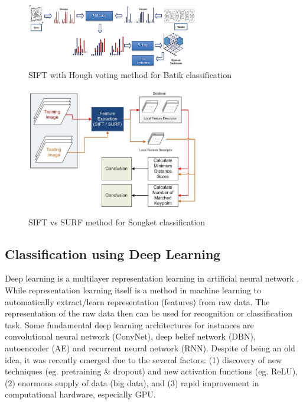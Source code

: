 \documentclass[conference]{IEEEtran}
\begin{document}
\begin{figure}[!b]
\centering
\includegraphics[width=3.0in]{sift-hough-voting-method}
\caption{SIFT with Hough voting method for Batik classification}
\label{fig_sift_hough_voting_method}
\end{figure}

\begin{figure}[!b]
\centering
\includegraphics[width=3.0in]{songket-sift-vs-surf-methodology}
\caption{SIFT vs SURF method for Songket classification}
\label{fig_songket_sift_vs_surf_methodology}
\end{figure}

\subsection{Classification using Deep Learning}

Deep learning is a multilayer representation learning in artificial neural network \cite{lecun2015deep}. While representation learning itself is a method in machine learning to automatically extract/learn representation (features) from raw data. The representation of the raw data then can be used for recognition or classification task. Some fundamental deep learning architectures for instances are convolutional neural network (ConvNet), deep belief network (DBN), autoencoder (AE) and recurrent neural network (RNN). Despite of being an old idea, it was recently emerged due to the several factors: (1) discovery of new techniques (eg. pretraining \& dropout) and new activation functions (eg. ReLU), (2) enormous supply of data (big data), and (3) rapid improvement in computational hardware, especially GPU.
\end{document}
